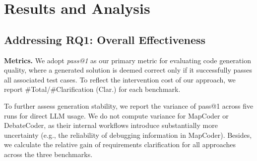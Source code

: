 \section{Results and Analysis}\label{sec:results}




\subsection{Addressing RQ1: Overall Effectiveness}
\label{sec:rq1}

\noindent \textbf{Metrics.}
We adopt \emph{pass@1} as our primary metric for evaluating code generation quality, where a generated solution is deemed correct only if it successfully passes all associated test cases. To reflect the intervention cost of our approach, we report \#Total/\#Clarification (Clar.) for each benchmark.

To further assess generation stability, we report the variance of pass@1 across five runs for direct LLM usage. We do not compute variance for MapCoder or DebateCoder, as their internal workflows introduce substantially more uncertainty (e.g., the reliability of debugging information in MapCoder).  Besides, we calculate the relative gain of requirements clarification for all approaches across the three benchmarks.

